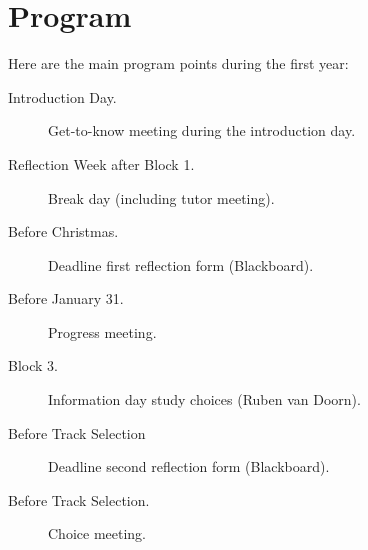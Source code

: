 \chapter{Program}

Here are the main program points during the first year:

\begin{description}

	\item[Introduction Day.] Get-to-know meeting during the introduction day.

	\item[Reflection Week after Block 1.] Break day (including tutor meeting).

	\item[Before Christmas.] Deadline first reflection form (Blackboard).

	\item[Before January 31.] Progress meeting.

	\item[Block 3.] Information day study choices (Ruben van Doorn).

	\item[Before Track Selection] Deadline second reflection form (Blackboard).

	\item[Before Track Selection.] Choice meeting.

\end{description}

